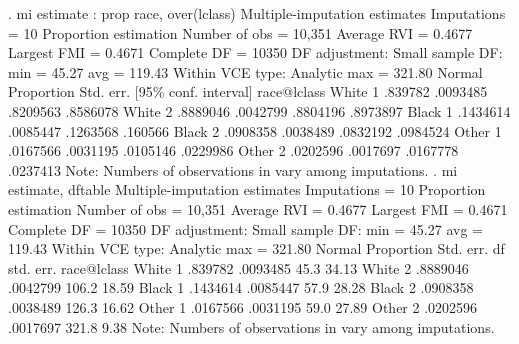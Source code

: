 . mi estimate : prop race, over(lclass) 
{\smallskip}
Multiple-imputation estimates     Imputations     =         10
Proportion estimation             Number of obs   =     10,351
                                  Average RVI     =     0.4677
                                  Largest FMI     =     0.4671
                                  Complete DF     =      10350
DF adjustment:   Small sample     DF:     min     =      45.27
                                          avg     =     119.43
Within VCE type:     Analytic             max     =     321.80
{\smallskip}
             {\VBAR}                                   Normal
             {\VBAR} Proportion   Std. err.     [95\% conf. interval]
 race@lclass {\VBAR}
    White 1  {\VBAR}    .839782   .0093485      .8209563    .8586078
    White 2  {\VBAR}   .8889046   .0042799      .8804196    .8973897
    Black 1  {\VBAR}   .1434614   .0085447      .1263568     .160566
    Black 2  {\VBAR}   .0908358   .0038489      .0832192    .0984524
    Other 1  {\VBAR}   .0167566   .0031195      .0105146    .0229986
    Other 2  {\VBAR}   .0202596   .0017697      .0167778    .0237413
Note: Numbers of observations in {} vary among imputations.
{\smallskip}
. mi estimate, dftable
{\smallskip}
Multiple-imputation estimates     Imputations     =         10
Proportion estimation             Number of obs   =     10,351
                                  Average RVI     =     0.4677
                                  Largest FMI     =     0.4671
                                  Complete DF     =      10350
DF adjustment:   Small sample     DF:     min     =      45.27
                                          avg     =     119.43
Within VCE type:     Analytic             max     =     321.80
{\smallskip}
             {\VBAR}                                          Normal
             {\VBAR} Proportion   Std. err.           df   std. err.
 race@lclass {\VBAR}
    White 1  {\VBAR}    .839782   .0093485          45.3       34.13
    White 2  {\VBAR}   .8889046   .0042799         106.2       18.59
    Black 1  {\VBAR}   .1434614   .0085447          57.9       28.28
    Black 2  {\VBAR}   .0908358   .0038489         126.3       16.62
    Other 1  {\VBAR}   .0167566   .0031195          59.0       27.89
    Other 2  {\VBAR}   .0202596   .0017697         321.8        9.38
Note: Numbers of observations in {} vary among imputations.
